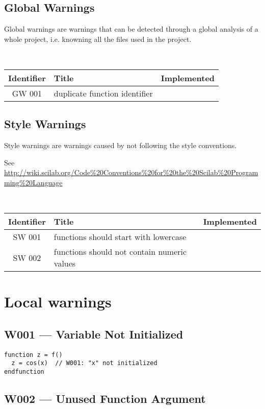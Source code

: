 \documentclass{article}
\begin{document}
\subsection{Global Warnings}

Global warnings are warnings that can be detected through a global
analysis of a whole project, i.e. knowning all the files used in the
project.

\noindent\\\begin{tabular}{|c|p{8cm}|c|} \hline
Identifier & Title & Implemented          \\ \hline
GW 001  & duplicate function identifier & \\ \hline
\end{tabular}

\subsection{Style Warnings}

Style warnings are warnings caused by not following the style
conventions.

See \url{http://wiki.scilab.org/Code%20Conventions%20for%20the%20Scilab%20Programming%20Language}

\noindent\\\begin{tabular}{|c|p{8cm}|c|} \hline
Identifier & Title & Implemented          \\ \hline
SW 001  & functions should start with lowercase & \\ \hline
SW 002  & functions should not contain numeric values & \\ \hline
\end{tabular}

\section{Local warnings}

\subsection{W001 --- Variable Not Initialized}

\begin{verbatim}
function z = f()
  z = cos(x)  // W001: "x" not initialized
endfunction
\end{verbatim}

\subsection{W002 --- Unused Function Argument}
\end{document}
